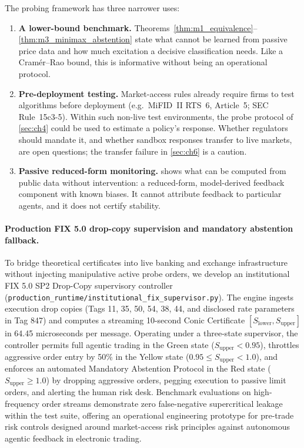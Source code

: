 \documentclass[10pt,twocolumn,letterpaper]{article}
\theoremstyle{definition}
\theoremstyle{remark}
\begin{document}
The probing framework has three narrower uses:
\begin{enumerate}
    \item \textbf{A lower-bound benchmark.} Theorems~\ref{thm:m1_equivalence}--\ref{thm:m3_minimax_abstention} state what cannot be learned from passive price data and how much excitation a decisive classification needs. Like a Cram\'er--Rao bound, this is informative without being an operational protocol.
    \item \textbf{Pre-deployment testing.} Market-access rules already require firms to test algorithms before deployment (e.g.\ MiFID~II RTS~6, Article~5; SEC Rule~15c3-5). Within such non-live test environments, the probe protocol of \cref{sec:ch4} could be used to estimate a policy's response. Whether regulators should mandate it, and whether sandbox responses transfer to live markets, are open questions; the transfer failure in \cref{sec:ch6} is a caution.
    \item \textbf{Passive reduced-form monitoring.}  shows what can be computed from public data without intervention: a reduced-form, model-derived feedback component with known biases. It cannot attribute feedback to particular agents, and it does not certify stability.
\end{enumerate}

\paragraph{Production FIX 5.0 drop-copy supervision and mandatory abstention fallback.}
To bridge theoretical certificates into live banking and exchange infrastructure without injecting manipulative active probe orders, we develop an institutional FIX 5.0 SP2 Drop-Copy supervisory controller (\texttt{production\_runtime/institutional\_fix\_supervisor.py}). The engine ingests execution drop copies (Tags 11, 35, 50, 54, 38, 44, and disclosed rate parameters in Tag 847) and computes a streaming 10-second Conic Certificate $[S_{\mathrm{lower}}, S_{\mathrm{upper}}]$ in 64.45 microseconds per message. Operating under a three-state supervisor, the controller permits full agentic trading in the Green state ($S_{\mathrm{upper}} < 0.95$), throttles aggressive order entry by 50\% in the Yellow state ($0.95 \le S_{\mathrm{upper}} < 1.0$), and enforces an automated Mandatory Abstention Protocol in the Red state ($S_{\mathrm{upper}} \ge 1.0$) by dropping aggressive orders, pegging execution to passive limit orders, and alerting the human risk desk. Benchmark evaluations on high-frequency order streams demonstrate zero false-negative supercritical leakage within the test suite, offering an operational engineering prototype for pre-trade risk controls designed around market-access risk principles against autonomous agentic feedback in electronic trading.
\end{document}
